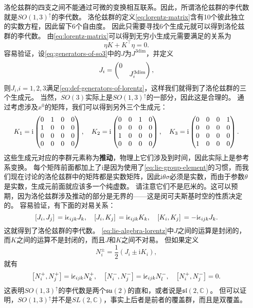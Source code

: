 \documentclass[hyperref, UTF8, a4paper]{ctexart}
\newcommand*{\ii}{\mathrm{i}}
\newcommand*{\complexes}{\mathbb{C}}
\begin{document}
洛伦兹群的四支之间不能通过可微的变换相互联系。因此，所谓洛伦兹群的李代数就是$SO(1,3)^\uparrow$的李代数。
洛伦兹群的定义\eqref{eq:lorentz-matrix}含有10个彼此独立的实数方程，因此留下6个自由度。
因此只需要寻找6个生成元就可以得到洛伦兹群的李代数。
由\eqref{eq:lorentz-matrix}可以得到无穷小生成元需要满足的关系为
\begin{equation}
    \eta K + K^\top \eta = 0.
    \label{eq:def-generators-of-lorentz}
\end{equation}
容易验证，设\eqref{eq:generators-of-so3}中的$J$为$J^\text{3dim}$，并定义
\begin{equation}
    J_i = \pmqty{\dmat{0 ,J^\text{3dim}_i}},
\end{equation}
则$J_i$,$i=1, 2, 3$满足\eqref{eq:def-generators-of-lorentz}，这样我们就得到了洛伦兹群的三个生成元。
当然，$SO(3)$实际上是$SO(1,3)^\uparrow$的一部分，因此这是合理的。
通过考虑涉及$x^0$的矩阵，我们可以得到另外三个生成元：
\begin{equation}
    K_1 = \ii \pmqty{0 & 1 & 0 & 0 \\ 1 & 0 & 0 & 0 \\ 0 & 0 & 0 & 0 \\ 0 & 0 & 0 & 0}, \quad 
    K_2 = \ii \pmqty{0 & 0 & 1 & 0 \\ 0 & 0 & 0 & 0 \\ 1 & 0 & 0 & 0 \\ 0 & 0 & 0 & 0}, \quad
    K_3 = \ii \pmqty{0 & 0 & 0 & 1 \\ 0 & 0 & 0 & 0 \\ 0 & 0 & 0 & 0 \\ 1 & 0 & 0 & 0}.
    \label{eq:boost-generators}
\end{equation}
这些生成元对应的李群元素称为\textbf{推动}，物理上它们涉及到时间，因此实际上是参考系变换。
每个矩阵前面都加上了$\ii$是因为使用了\eqref{eq:lie-group-element}的习惯，而我们现在讨论的洛伦兹群中的矩阵都是实数矩阵，因此$\ii \theta \sigma$必须是实数，而由于参数$\theta$是实数，生成元前面就应该多一个纯虚数。
请注意它们不是厄米的。这可以预期，因为洛伦兹群涉及推动的部分是无界的——这是闵可夫斯基时空的性质决定的。
容易验证，有下面的对易关系：
\begin{equation}
    \comm*{J_i}{J_j} = \ii \epsilon_{ijk} J_k, \quad \comm*{J_i}{K_j} = \ii \epsilon_{ijk} K_k, \quad \comm*{K_i}{K_j} = - \ii \epsilon_{ijk} J_k.
    \label{eq:lie-algebra-lorentz}
\end{equation}
这就得到了洛伦兹群的李代数。
\eqref{eq:lie-algebra-lorentz}中$J$之间的运算是封闭的，而$K$之间的运算不是封闭的，而且$J$和$K$之间不对易。
但如果定义
\begin{equation}
    N_i^\pm = \frac{1}{2} (J_i \pm \ii K_i),
    \label{eq:def-n-pm}
\end{equation}
就有
\begin{equation}
    \comm{N_i^+}{N_j^+} = \ii \epsilon_{ijk} N_k^+, \quad \comm{N_i^-}{N_j^-} = \ii \epsilon_{ijk} N_l^-, \quad \comm{N^+_i}{N^-_j} = 0.
    \label{eq:two-su2-algebra}
\end{equation}
这表明$SO(1,3)^\uparrow$的李代数是两个$\mathfrak{su}(2)$的直和，或者说是$\mathfrak{sl}(2, \complexes)$。
但可以证明，$SO(1,3)^\uparrow$并不是$SL(2, \complexes)$，事实上后者是前者的覆盖群，而且是双覆盖。
\end{document}

